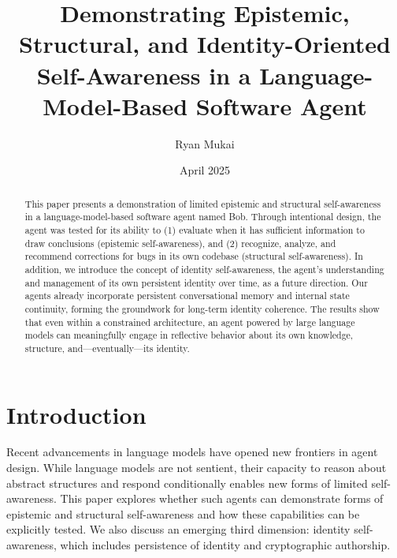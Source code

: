 \documentclass[11pt]{article}
\title{Demonstrating Epistemic, Structural, and Identity-Oriented Self-Awareness in a Language-Model-Based Software Agent}
\author{Ryan Mukai}
\date{April 2025}
\begin{document}
\maketitle

\begin{abstract}
This paper presents a demonstration of limited epistemic and structural self-awareness in a language-model-based software agent named Bob. Through intentional design, the agent was tested for its ability to (1) evaluate when it has sufficient information to draw conclusions (epistemic self-awareness), and (2) recognize, analyze, and recommend corrections for bugs in its own codebase (structural self-awareness). In addition, we introduce the concept of identity self-awareness, the agent's understanding and management of its own persistent identity over time, as a future direction. Our agents already incorporate persistent conversational memory and internal state continuity, forming the groundwork for long-term identity coherence. The results show that even within a constrained architecture, an agent powered by large language models can meaningfully engage in reflective behavior about its own knowledge, structure, and—eventually—its identity.
\end{abstract}

\section{Introduction}
Recent advancements in language models have opened new frontiers in agent design. While language models are not sentient, their capacity to reason about abstract structures and respond conditionally enables new forms of limited self-awareness. This paper explores whether such agents can demonstrate forms of epistemic and structural self-awareness and how these capabilities can be explicitly tested. We also discuss an emerging third dimension: identity self-awareness, which includes persistence of identity and cryptographic authorship.
\end{document}
